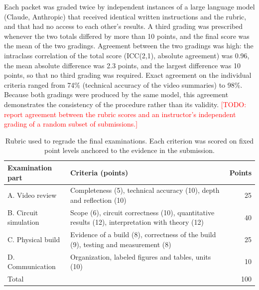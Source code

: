 \documentclass[fleqn,10pt]{JLA_article} %
\begin{document}
Each packet was graded twice by independent instances of a large language model (Claude, Anthropic) that received identical written instructions and the rubric, and that had no access to each other's results. A third grading was prescribed whenever the two totals differed by more than 10 points, and the final score was the mean of the two gradings. Agreement between the two gradings was high: the intraclass correlation of the total score (ICC(2,1), absolute agreement) was 0.96, the mean absolute difference was 2.3 points, and the largest difference was 10 points, so that no third grading was required. Exact agreement on the individual criteria ranged from 74\% (technical accuracy of the video summaries) to 98\%. Because both gradings were produced by the same model, this agreement demonstrates the consistency of the procedure rather than its validity. \textcolor{red}{[TODO: report agreement between the rubric scores and an instructor's independent grading of a random subset of submissions.]}

\begin{table}[ht]
    \centering
    \caption{Rubric used to regrade the final examinations. Each criterion was scored on fixed point levels anchored to the evidence in the submission.}
    \begin{tabular}{p{4.2cm} p{8cm} r}
        \toprule
        \textbf{Examination part} & \textbf{Criteria (points)} & \textbf{Points} \\
        \midrule
        A. Video review & Completeness (5), technical accuracy (10), depth and reflection (10) & 25 \\
        B. Circuit simulation & Scope (6), circuit correctness (10), quantitative results (12), interpretation with theory (12) & 40 \\
        C. Physical build & Evidence of a build (8), correctness of the build (9), testing and measurement (8) & 25 \\
        D. Communication & Organization, labeled figures and tables, units (10) & 10 \\
        \midrule
        Total & & 100 \\
        \bottomrule
    \end{tabular}
    \label{tab:exam_rubric}
\end{table}
\end{document}
